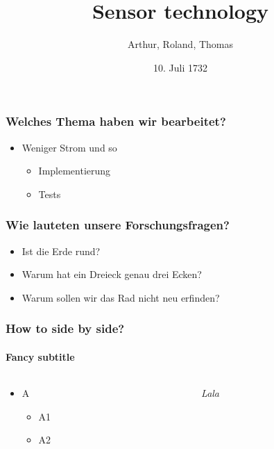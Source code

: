 \documentclass{beamer}
\date{10. Juli 1732}
\title{Sensor technology}
\author{Arthur, Roland, Thomas}
\begin{document}
\begin{frame}
    \titlepage
\end{frame}

\begin{frame}
    \frametitle{Welches Thema haben wir bearbeitet?}

    \begin{itemize}
        \item Weniger Strom und so
              \begin{itemize}
                  \item Implementierung
                  \item Tests
              \end{itemize}
    \end{itemize}
\end{frame}

\begin{frame}
    \frametitle{Wie lauteten unsere Forschungsfragen?}

    \begin{itemize}
        \item Ist die Erde rund?
        \item Warum hat ein Dreieck genau drei Ecken?
        \item Warum sollen wir das Rad nicht neu erfinden?
    \end{itemize}
\end{frame}

\begin{frame}
    \frametitle{How to side by side?}
    \framesubtitle{Fancy subtitle}

    \begin{columns}
        \begin{column}{0.5\textwidth}
            \begin{itemize}
                \item A
                      \begin{itemize}
                          \item A1
                          \item A2
                      \end{itemize}
            \end{itemize}
        \end{column}
        \begin{column}{0.5\textwidth}
            \textit{Lala}
        \end{column}
    \end{columns}
\end{frame}








    


\end{document}

